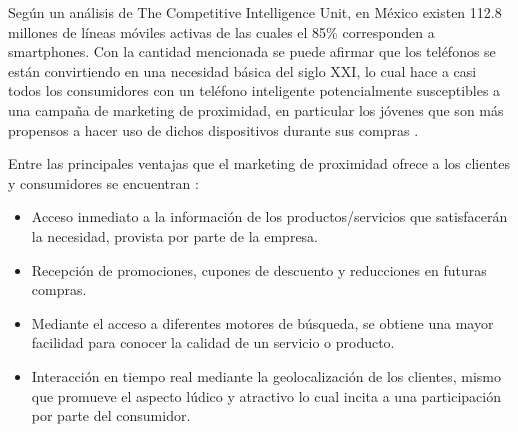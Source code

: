 
Según un análisis de The Competitive Intelligence Unit, en México existen 112.8 millones de líneas móviles activas de las cuales el 85\% corresponden a smartphones. Con la cantidad mencionada se puede afirmar que los teléfonos se están convirtiendo en una necesidad básica del siglo XXI, lo cual hace a casi todos los consumidores con un teléfono inteligente potencialmente susceptibles a una campaña de marketing de proximidad, en particular los jóvenes que son más propensos a hacer uso de dichos dispositivos durante sus compras  \cite{Marketing2}.
\\ \par
Entre las principales ventajas que el marketing de proximidad ofrece a los clientes y consumidores se encuentran \cite{Marketing3}: \\
\begin{itemize}
\item Acceso inmediato a la información de los productos/servicios que satisfacerán la necesidad, provista por parte de la empresa.
\item Recepción de promociones, cupones de descuento y reducciones en futuras compras.
\item Mediante el acceso a diferentes motores de búsqueda, se obtiene una mayor facilidad para conocer la calidad de un servicio o producto.
\item Interacción en tiempo real mediante la geolocalización de los clientes, mismo que promueve el aspecto lúdico y atractivo lo cual incita a una participación por parte del consumidor. 
\end{itemize}